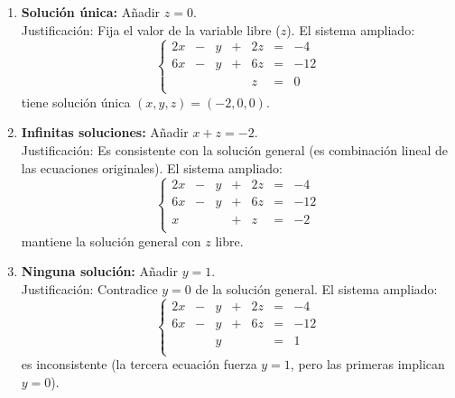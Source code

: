 \begin{prob}
\begin{myproof}
\begin{enumerate}[$a)$]
\item \textbf{Solución única:} Añadir $z = 0$.\\
Justificación: Fija el valor de la variable libre ($z$). El sistema ampliado:
\[
\left\lbrace \begin{array}{rcrcrcl}
2x & - & y & + & 2z & = & -4 \\
6x & - & y & + & 6z & = & -12 \\
& & & & z & = & 0 \\
\end{array} \right.
\]
tiene solución única $(x, y, z) = (-2, 0, 0)$.

\item \textbf{Infinitas soluciones:} Añadir $x + z = -2$.\\
Justificación: Es consistente con la solución general (es combinación lineal de las ecuaciones originales). El sistema ampliado:
\[
\left\lbrace \begin{array}{rcrcrcl}
2x & - & y & + & 2z & = & -4 \\
6x & - & y & + & 6z & = & -12 \\
x & & & + & z & = & -2 \\
\end{array} \right.
\]
mantiene la solución general con $z$ libre.

\item \textbf{Ninguna solución:} Añadir $y = 1$.\\
Justificación: Contradice $y = 0$ de la solución general. El sistema ampliado:
\[
\left\lbrace \begin{array}{rcrcrcl}
2x & - & y & + & 2z & = & -4 \\
6x & - & y & + & 6z & = & -12 \\
& & y & & & = & 1 \\
\end{array} \right.
\]
es inconsistente (la tercera ecuación fuerza $y=1$, pero las primeras implican $y=0$).
\end{enumerate}
\end{myproof}
\end{prob}

